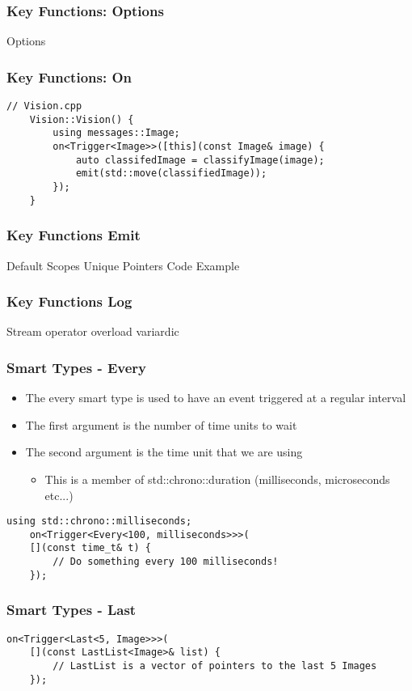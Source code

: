 \documentclass{beamer}
\begin{document}
\begin{frame}
	\frametitle {Key Functions: Options}
\end{frame}

\begin{frame}
	Options
\end{frame}

\begin{frame}[fragile]
	\frametitle{Key Functions: On}
	\begin{lstlisting}[language=nuclear]
	// Vision.cpp
	Vision::Vision() {
		using messages::Image;
		on<Trigger<Image>>([this](const Image& image) {
			auto classifedImage = classifyImage(image);
			emit(std::move(classifiedImage));
		});
	}
	\end{lstlisting}
\end{frame}

\begin{frame}
	\frametitle{Key Functions Emit}
	Default
	Scopes
	Unique Pointers
	Code Example
\end{frame}

\begin{frame}
	\frametitle{Key Functions Log}
	Stream operator overload
	variardic
\end{frame}

\begin{frame}[fragile]
	\frametitle{Smart Types - Every}
	\begin{itemize}
		\item The every smart type is used to have an event triggered at a regular interval
		\item The first argument is the number of time units to wait
		\item The second argument is the time unit that we are using
		\begin{itemize}
			\item This is a member of std::chrono::duration (milliseconds, microseconds etc...)
		\end{itemize}
	\end{itemize}

	\begin{lstlisting}[language=nuclear]
	using std::chrono::milliseconds;
	on<Trigger<Every<100, milliseconds>>>(
	[](const time_t& t) {
		// Do something every 100 milliseconds!
	});
	\end{lstlisting}
\end{frame}

\begin{frame}[fragile]
	\frametitle{Smart Types - Last}
	\begin{lstlisting}[language=nuclear]
	on<Trigger<Last<5, Image>>>(
	[](const LastList<Image>& list) {
		// LastList is a vector of pointers to the last 5 Images
	});
	\end{lstlisting}
\end{frame}
\end{document}
